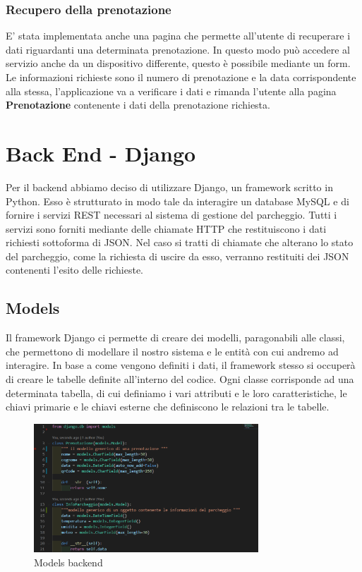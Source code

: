 \documentclass[a4paper,11pt]{report}
\begin{document}
\subsubsection{Recupero della prenotazione}
E' stata implementata anche una pagina che permette all'utente di recuperare i dati riguardanti una determinata prenotazione. In questo modo può accedere al servizio anche da un dispositivo differente, questo è possibile mediante un form. Le informazioni richieste sono il numero di prenotazione e la data corrispondente alla stessa, l'applicazione va a verificare i dati e rimanda l'utente alla pagina \textbf{Prenotazione} contenente i dati della prenotazione richiesta.
\newpage
\section{Back End - Django}
Per il backend abbiamo deciso di utilizzare Django, un framework scritto in Python. Esso è strutturato in modo tale da interagire un database MySQL e di fornire i servizi REST necessari al sistema di gestione del parcheggio. Tutti i servizi sono forniti mediante delle chiamate HTTP che restituiscono i dati richiesti sottoforma di JSON. Nel caso si tratti di chiamate che alterano lo stato del parcheggio, come la richiesta di uscire da esso, verranno restituiti dei JSON contenenti l'esito delle richieste.

\subsection{Models}
Il framework Django ci permette di creare dei modelli, paragonabili alle classi, che permettono di modellare il nostro sistema e le entità con cui andremo ad interagire. In base a come vengono definiti i dati, il framework stesso si occuperà di creare le tabelle definite all'interno del codice. Ogni classe corrisponde ad una determinata tabella, di cui definiamo i vari attributi e le loro caratteristiche, le chiavi primarie e le chiavi esterne che definiscono le relazioni tra le tabelle.
\begin{figure}[H]
    \centering
    \includegraphics[width=0.75\textwidth]{models_py.png}
    \caption{Models backend }
    \label{fig:modelsBackend}
\end{figure}
\end{document}
